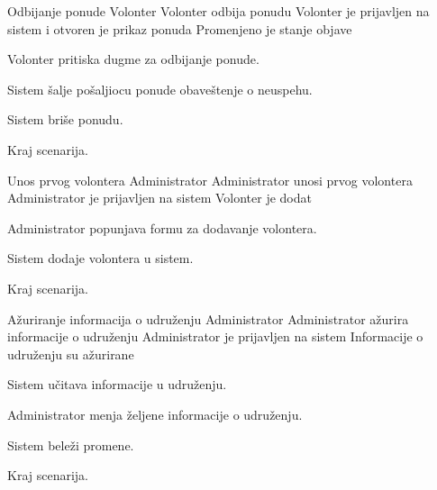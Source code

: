         {Odbijanje ponude}
        {Volonter}
        {Volonter odbija ponudu}
        {Volonter je prijavljen na sistem i otvoren je prikaz ponuda}
        {Promenjeno je stanje objave}
        {
            \item Volonter pritiska dugme za odbijanje ponude. 
            \item Sistem šalje pošaljiocu ponude obaveštenje o neuspehu.
            \item Sistem briše ponudu.
            \item Kraj scenarija.
        }
        {}
    
        {Unos prvog volontera}
        {Administrator}
        {Administrator unosi prvog volontera}
        {Administrator je prijavljen na sistem}
        {Volonter je dodat}
        {
            \item Administrator popunjava formu za dodavanje volontera.
            \item Sistem dodaje volontera u sistem.
            \item Kraj scenarija.
        }
        {}
        
        {Ažuriranje informacija o udruženju}
        {Administrator}
        {Administrator ažurira informacije o udruženju}
        {Administrator je prijavljen na sistem}
        {Informacije o udruženju su ažurirane}
        {
            \item Sistem učitava informacije u udruženju.
            \item Administrator menja željene informacije o udruženju.
            \item Sistem beleži promene.
            \item Kraj scenarija.
        }
        {}